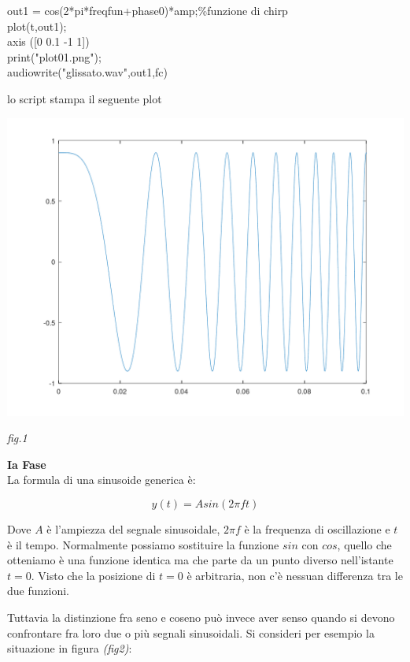 \documentclass[11pt]{article}
\begin{document}
\begin{multicols*}{2}
\begin{center}
\begin{minipage}[c]{6.2cm}
\begin{sffamily}
out1 = cos(2*pi*freqfun+phase0)*amp;\%funzione di chirp\\

plot(t,out1);\\
axis ([0 0.1 -1 1])\\
print("plot01.png");\\

audiowrite("glissato.wav",out1,fc)

\end{sffamily}
\end{minipage}
\end{center}

lo script stampa il seguente plot

\begin{center}
\includegraphics[scale=0.2]{images/plot01.png}

{\scriptsize \emph{fig.1 }}
\end{center}


\textbf{\textsf {Ia Fase}}\\

\noindent La formula di una sinusoide generica è:

\[
y(t) = Asin(2\pi ft)
\]

Dove $A$ è l'ampiezza del segnale sinusoidale, $2\pi f$ è la frequenza di oscillazione e $t$ è il tempo. Normalmente possiamo sostituire la funzione $sin$ con $cos$, quello che otteniamo è una funzione identica ma che parte da un punto diverso nell'istante $t = 0$. Visto che la posizione di $t = 0$ è arbitraria, non c'è nessuan differenza tra le due funzioni.

Tuttavia la distinzione fra seno e coseno può invece aver senso quando si devono confrontare fra loro due o più segnali sinusoidali. Si consideri per esempio la situazione in figura \textit{(fig2)}:


\end{multicols*}
\end{document}
